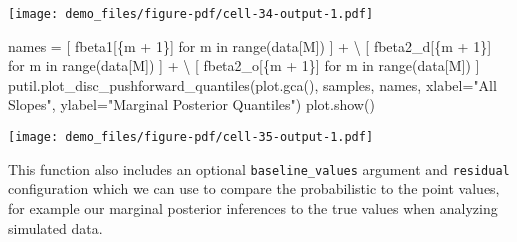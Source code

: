 \documentclass[
  letterpaper,
  DIV=11,
  numbers=noendperiod]{scrartcl}
\newenvironment{Shaded}{\begin{snugshade}}{\end{snugshade}}
\newcommand{\BuiltInTok}[1]{\textcolor[rgb]{0.00,0.23,0.31}{#1}}
\newcommand{\ControlFlowTok}[1]{\textcolor[rgb]{0.00,0.23,0.31}{#1}}
\newcommand{\DecValTok}[1]{\textcolor[rgb]{0.68,0.00,0.00}{#1}}
\newcommand{\KeywordTok}[1]{\textcolor[rgb]{0.00,0.23,0.31}{#1}}
\newcommand{\NormalTok}[1]{\textcolor[rgb]{0.00,0.23,0.31}{#1}}
\newcommand{\OperatorTok}[1]{\textcolor[rgb]{0.37,0.37,0.37}{#1}}
\newcommand{\SpecialCharTok}[1]{\textcolor[rgb]{0.37,0.37,0.37}{#1}}
\newcommand{\SpecialStringTok}[1]{\textcolor[rgb]{0.13,0.47,0.30}{#1}}
\newcommand{\StringTok}[1]{\textcolor[rgb]{0.13,0.47,0.30}{#1}}
\begin{document}
\texttt{[image: demo\_files/figure-pdf/cell-34-output-1.pdf]}

\begin{Shaded}
\begin{Highlighting}[]
\NormalTok{names }\OperatorTok{=}\NormalTok{ [ }\SpecialStringTok{f\textquotesingle{}beta1[}\SpecialCharTok{\{}\NormalTok{m }\OperatorTok{+} \DecValTok{1}\SpecialCharTok{\}}\SpecialStringTok{]\textquotesingle{}} \ControlFlowTok{for}\NormalTok{ m }\KeywordTok{in} \BuiltInTok{range}\NormalTok{(data[}\StringTok{\textquotesingle{}M\textquotesingle{}}\NormalTok{]) ] }\OperatorTok{+} \OperatorTok{\textbackslash{}}
\NormalTok{        [ }\SpecialStringTok{f\textquotesingle{}beta2\_d[}\SpecialCharTok{\{}\NormalTok{m }\OperatorTok{+} \DecValTok{1}\SpecialCharTok{\}}\SpecialStringTok{]\textquotesingle{}} \ControlFlowTok{for}\NormalTok{ m }\KeywordTok{in} \BuiltInTok{range}\NormalTok{(data[}\StringTok{\textquotesingle{}M\textquotesingle{}}\NormalTok{]) ] }\OperatorTok{+} \OperatorTok{\textbackslash{}}
\NormalTok{        [ }\SpecialStringTok{f\textquotesingle{}beta2\_o[}\SpecialCharTok{\{}\NormalTok{m }\OperatorTok{+} \DecValTok{1}\SpecialCharTok{\}}\SpecialStringTok{]\textquotesingle{}} \ControlFlowTok{for}\NormalTok{ m }\KeywordTok{in} \BuiltInTok{range}\NormalTok{(data[}\StringTok{\textquotesingle{}M\textquotesingle{}}\NormalTok{]) ]}
\NormalTok{putil.plot\_disc\_pushforward\_quantiles(plot.gca(), samples, names,}
\NormalTok{                                      xlabel}\OperatorTok{=}\StringTok{"All Slopes"}\NormalTok{,}
\NormalTok{                                      ylabel}\OperatorTok{=}\StringTok{"Marginal Posterior Quantiles"}\NormalTok{)}
\NormalTok{plot.show()}
\end{Highlighting}
\end{Shaded}

\texttt{[image: demo\_files/figure-pdf/cell-35-output-1.pdf]}

This function also includes an optional \texttt{baseline\_values}
argument and \texttt{residual} configuration which we can use to compare
the probabilistic to the point values, for example our marginal
posterior inferences to the true values when analyzing simulated data.
\end{document}
